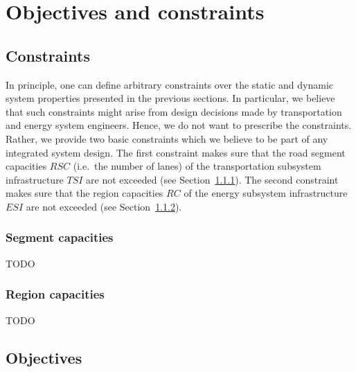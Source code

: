
\section{Objectives and constraints}
\subsection{Constraints}
\label{constraints}

In principle, one can define arbitrary constraints over the static and dynamic system properties presented in the previous sections. In particular, we believe that such constraints might arise from design decisions made by transportation and energy system engineers. Hence, we do not want to prescribe the constraints. Rather, we provide two basic constraints which we believe to be part of any integrated system design. The first constraint makes sure that the road segment capacities $RSC$ (i.e.\ the number of lanes) of the transportation subsystem infrastructure $TSI$ are not exceeded (see Section~\ref{collisions}). The second constraint makes sure that the region capacities $RC$ of the energy subsystem infrastructure $ESI$ are not exceeded (see Section~\ref{capacities}).

\subsubsection{Segment capacities}
\label{collisions}

TODO


\subsubsection{Region capacities}
\label{capacities}

TODO

\subsection{Objectives}
\label{objectives}

